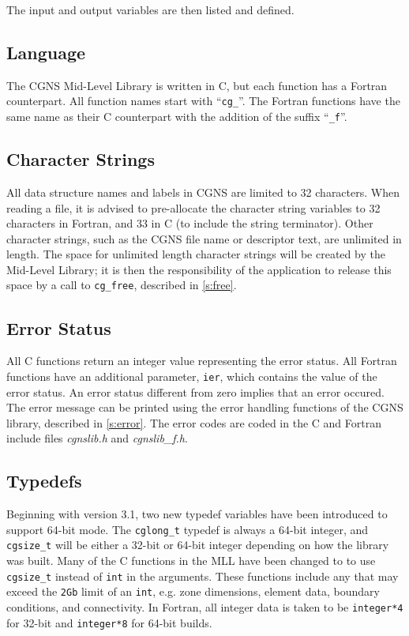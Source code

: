 The input and output variables are then listed and defined.

\subsection{Language}

The CGNS Mid-Level Library is written in C, but each function has a
Fortran counterpart.
All function names start with ``\texttt{cg\_}''.
The Fortran functions have the same name as their C counterpart with the
addition of the suffix ``\texttt{\_f}''.

\subsection{Character Strings}

All data structure names and labels in CGNS are limited to 32
characters.
When reading a file, it is advised to pre-allocate the
character string variables to 32 characters in Fortran, and 33
in C (to include the string terminator).
Other character strings, such as the CGNS file name or
descriptor text, are unlimited in length.
The space for unlimited length character strings will be created by the
Mid-Level Library; it is then the responsibility of the application to
release this space by a call to \texttt{cg\_free}, described in
\autoref{s:free}.

\subsection{Error Status}

All C functions return an integer value representing the error
status.
All Fortran functions have an additional parameter, \texttt{ier},
which contains the value of the error status.
An error status different from zero implies that an error occured.
The error message can be printed using the error
handling functions of the CGNS library, described in \autoref{s:error}.
The error codes are coded in the C and Fortran include files
\textit{cgnslib.h} and \textit{cgnslib\_f.h}.

\subsection{Typedefs}
\label{s:typedefs}

Beginning with version 3.1, two new typedef variables have been
introduced to support 64-bit mode. The \texttt{cglong\_t} typedef
is always a 64-bit integer, and \texttt{cgsize\_t} will be either
a 32-bit or 64-bit integer depending on how the library was built.
Many of the C functions in the MLL have been changed
to to use \texttt{cgsize\_t} instead of \texttt{int} in the arguments.
These functions include any that may exceed the \texttt{2Gb} limit
of an \texttt{int}, e.g. zone dimensions, element data, boundary
conditions, and connectivity. In Fortran, all integer data is taken
to be \texttt{integer*4} for 32-bit and \texttt{integer*8} for 64-bit
builds.

